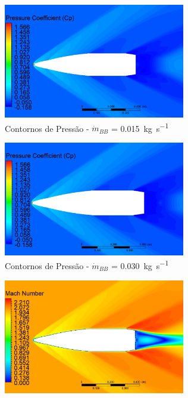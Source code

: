 \begin{figure}[!ht]
	\centering
	\begin{subfigure}[b]{0.47\textwidth} %
        \centering
        \includegraphics[height=5cm,width=\textwidth]{contorno-pressao-2306K-vazao-0015-1pol.png}
        \caption{Contornos de Pressão - \(\Dot{m}_{BB}\) = \qty{0,015}{\kilogram\per\second}}
        \label{fig:contorno-pressao-bb-1pol-vazao0015}
    \end{subfigure}
    \hfill
    \begin{subfigure}[b]{0.47\textwidth} %
        \centering
        \includegraphics[height=5cm,width=\textwidth]{contorno-pressao-2306K-vazao-0030-1pol.png}
        \caption{Contornos de Pressão - \(\Dot{m}_{BB}\) = \qty{0,030}{\kilogram\per\second}}
        \label{fig:contorno-pressao-bb-1pol-vazao0030}
    \end{subfigure}
    \hfill
    \begin{subfigure}[b]{0.47\textwidth} %
        \centering
        \includegraphics[height=5cm,width=\textwidth]{contorno-velocidade-2306K-vazao-0015-1pol.png}

\end{subfigure}
\end{figure}
